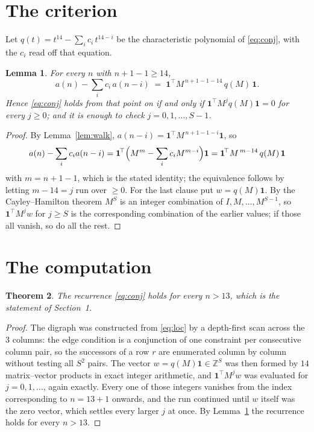 \documentclass[11pt,a4paper]{article}
\theoremstyle{plain}
\newtheorem{theorem}{Theorem}
\newtheorem{lemma}[theorem]{Lemma}
\theoremstyle{definition}
\begin{document}
\section{The criterion}

Let $q(t)=t^{14}-\sum_i c_i\,t^{14-i}$ be the characteristic polynomial of
\eqref{eq:conj}, with the $c_i$ read off that equation.

\begin{lemma}\label{lem:crit}
For every $n$ with $n+1-1\ge14$,
\[
a(n)-\sum_i c_i\,a(n-i)\;=\;\mathbf{1}^{\!\top}M^{\,n+1-1-14}\,q(M)\,\mathbf{1} .
\]
Hence \eqref{eq:conj} holds from that point on if and only if
$\mathbf{1}^{\!\top}M^{j}q(M)\mathbf{1}=0$ for every $j\ge0$; and it is enough to check
$j=0,1,\dots,S-1$.
\end{lemma}

\begin{proof}
By Lemma~\ref{lem:walk}, $a(n-i)=\mathbf{1}^{\!\top}M^{\,n+1-1-i}\mathbf{1}$, so
\[
a(n)-\sum_i c_i a(n-i)
=\mathbf{1}^{\!\top}\Bigl(M^{m}-\sum_i c_i M^{m-i}\Bigr)\mathbf{1}
=\mathbf{1}^{\!\top}M^{\,m-14}\,q(M)\,\mathbf{1}
\]
with $m=n+1-1$, which is the stated identity; the equivalence follows by letting
$m-14=j$ run over $\ge0$. For the last clause put $w=q(M)\mathbf{1}$. By the
Cayley--Hamilton theorem $M^{S}$ is an integer combination of $I,M,\dots,M^{S-1}$, so
$\mathbf{1}^{\!\top}M^{j}w$ for $j\ge S$ is the corresponding combination of the earlier
values; if those all vanish, so do all the rest.
\end{proof}

\section{The computation}

\begin{theorem}
The recurrence \eqref{eq:conj} holds for every $n>13$, which is the statement of
Section~1.
\end{theorem}

\begin{proof}
The digraph was constructed from \eqref{eq:loc} by a depth-first scan across the $3$
columns: the edge condition is a conjunction of one constraint per consecutive column
pair, so the successors of a row $r$ are enumerated column by column without testing all
$S^2$ pairs. The vector $w=q(M)\mathbf{1}\in\mathbb{Z}^{S}$ was then formed by $14$
matrix--vector products in exact integer arithmetic, and $\mathbf{1}^{\!\top}M^{j}w$ was
evaluated for $j=0,1,\dots$, again exactly. Every one of those integers vanishes from the
index corresponding to $n=13+1$ onwards, and the run continued until $w$ itself was the
zero vector, which settles every larger $j$ at once. By Lemma~\ref{lem:crit} the recurrence
holds for every $n>13$.
\end{proof}
\end{document}
